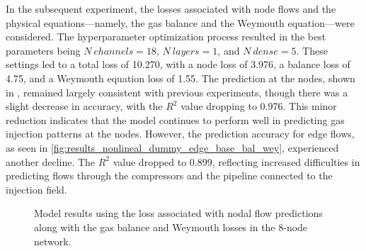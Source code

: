 In the subsequent experiment, the losses associated with node flows and the physical equations—namely, the gas balance and the Weymouth equation—were considered. The hyperparameter optimization process resulted in the best parameters being $N \ channels=18$, $N \ layers=1$, and $N \ dense=5$. These settings led to a total loss of 10.270, with a node loss of 3.976, a balance loss of 4.75, and a Weymouth equation loss of 1.55. The prediction at the nodes, shown in , remained largely consistent with previous experiments, though there was a slight decrease in accuracy, with the $R^2$ value dropping to 0.976. This minor reduction indicates that the model continues to perform well in predicting gas injection patterns at the nodes. However, the prediction accuracy for edge flows, as seen in \cref{fig:results_nonlineal_dummy_edge_base_bal_wey}, experienced another decline. The $R^2$ value dropped to 0.899, reflecting increased difficulties in predicting flows through the compressors and the pipeline connected to the injection field. 



\begin{figure}
    \centering
    \setlength{}        
    \setlength{} 
    
    \caption{Model results using the loss associated with nodal flow predictions along with the gas balance and Weymouth losses in the 8-node network.}
    \label{fig:dummy_base_results}
\end{figure}



